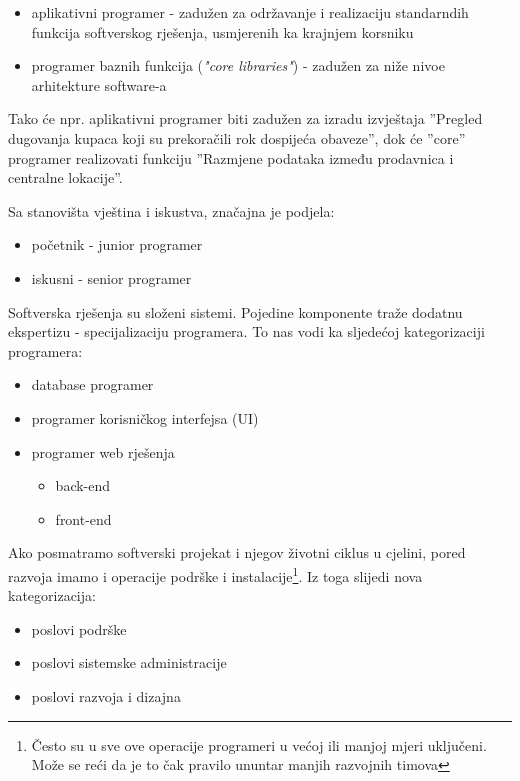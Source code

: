 \documentclass[times, utf8, seminar]{fit}
\begin{document}
\begin{itemize}
  \item aplikativni programer - zadužen za održavanje i realizaciju standarndih funkcija softverskog rješenja, usmjerenih ka krajnjem korsniku 
  \item programer baznih funkcija (\emph{"core libraries"}) - zadužen za niže nivoe arhitekture software-a
\end{itemize}

Tako će npr. aplikativni programer biti zadužen za izradu izvještaja ''Pregled dugovanja kupaca koji su prekoračili rok dospijeća obaveze'',  dok će ''core'' programer realizovati funkciju ''Razmjene podataka između prodavnica i centralne lokacije''.  

Sa stanovišta vještina i iskustva, značajna je podjela:
\begin{itemize}
  \item početnik - junior programer
  \item iskusni - senior programer
\end{itemize}

Softverska rješenja su složeni sistemi. Pojedine komponente traže dodatnu ekspertizu - specijalizaciju programera. To nas vodi ka sljedećoj kategorizaciji programera:
\begin{itemize}
  \item database programer
  \item programer korisničkog interfejsa (UI)
  \item programer web rješenja
     \begin{itemize}
          \item back-end
          \item front-end
      \end{itemize}
\end{itemize}

Ako posmatramo softverski projekat i njegov životni ciklus u cjelini, pored razvoja imamo i operacije podrške i instalacije\footnote{Često su u sve ove operacije programeri u većoj ili manjoj mjeri uključeni. Može se reći da je to čak pravilo ununtar manjih razvojnih timova}. Iz toga slijedi nova kategorizacija: 
\begin{itemize}
   \item poslovi podrške
   \item poslovi sistemske administracije
   \item poslovi razvoja i dizajna
\end{itemize}
\end{document}

